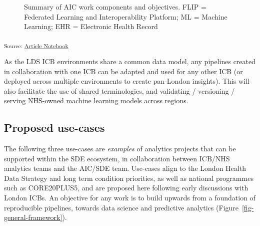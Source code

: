 \documentclass[
  letterpaper,
  DIV=11,
  numbers=noendperiod]{scrartcl}
\begin{document}
\begin{figure}


\caption{\label{fig-aic-objectives}Summary of AIC work components and
objectives. FLIP = Federated Learning and Interoperability Platform; ML
= Machine Learning; EHR = Electronic Health Record}

\end{figure}%

\textsubscript{Source:
\href{https://d3london.github.io/sde_aic_docs/index.qmd.html}{Article
Notebook}}

As the LDS ICB environments share a common data model, any pipelines
created in collaboration with one ICB can be adapted and used for any
other ICB (or deployed across multiple environments to create pan-London
insights). This will also facilitate the use of shared terminologies,
and validating / versioning / serving NHS-owned machine learning models
across regions.

\subsection{Proposed use-cases}\label{proposed-use-cases}

The following three use-cases are \emph{examples} of analytics projects
that can be supported within the SDE ecosystem, in collaboration between
ICB/NHS analytics teams and the AIC/SDE team. Use-cases align to the
London Health Data Strategy and long term condition priorities, as well
as national programmes such as CORE20PLUS5, and are proposed here
following early discussions with London ICBs. An objective for any work
is to build upwards from a foundation of reproducible pipelines, towards
data science and predictive analytics
(Figure~\ref{fig-general-framework}).
\end{document}
